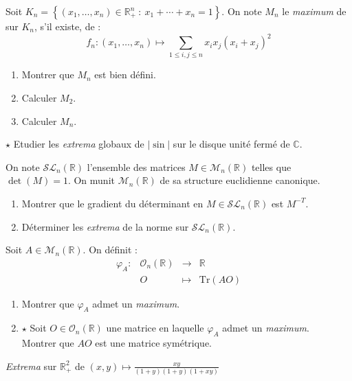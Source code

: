 \documentclass[french,a4paper]{article}
\newcommand{\R}{\mathbb{R}}
\newcommand{\C}{\mathbb{C}}
\newcommand{\Tr}{\text{Tr}}
\theoremstyle{plain}
\theoremstyle{definition}
\theoremstyle{remark}
\begin{document}
\begin{ex}[Moulin.CD.46]{}
	Soit $K_n=\left\{(x_1,\ldots,x_n)\in\R_+^n\ : \ x_1+\cdots+x_n=1\right\}$. On note $M_n$ le \textit{maximum} de sur $K_n$, s'il existe, de : $$f_n:(x_1,\ldots,x_n)\mapsto\sum_{1\leqslant i,j\leqslant n}x_ix_j(x_i+x_j)^2$$
	\begin{enumerate}
		\item Montrer que $M_n$ est bien défini.
		\item Calculer $M_2$. 
		\item Calculer $M_n$.
	\end{enumerate}
\end{ex}

\begin{ex}[Moulin.CD.47]{$\star$}
	Etudier les \textit{extrema} globaux de $\lvert \sin\rvert$ sur le disque unité fermé de $\C$.
\end{ex}

\begin{ex}[Moulin.CD.48]{}
	On note $\mathcal{SL}_n(\R)$ l'ensemble des matrices $M\in\mathcal{M}_n(\R)$ telles que $\det(M)=1$. On munit $\mathcal{M}_n(\R)$ de sa structure euclidienne canonique.
	\begin{enumerate}
		\item Montrer que le gradient du déterminant en $M\in\mathcal{SL}_n(\R)$ est $M^{-T}$.
		\item Déterminer les \textit{extrema} de la norme sur $\mathcal{SL}_n(\R)$.
	\end{enumerate}
\end{ex}

\begin{ex}[Moulin.CD.49]{}
	Soit $A\in\mathcal{M}_n(\R)$. On définit : $$\begin{array}{lrcl}
		\varphi_A:&\mathcal{O}_n(\R)&\longrightarrow&\R\\
		&O&\longmapsto&\Tr(AO)
	\end{array}$$
	\begin{enumerate}
		\item Montrer que $\varphi_A$ admet un \textit{maximum}.
		\item $\star$ Soit $O\in\mathcal{O}_n(\R)$ une matrice en laquelle $\varphi_A$ admet un \textit{maximum}. \\ Montrer que $AO$ est une matrice symétrique.
	\end{enumerate}
\end{ex}

\begin{ex}[Moulin.CD.50]{}
	\textit{Extrema} sur $\R_+^2$ de $(x,y)\mapsto\displaystyle\frac{xy}{(1+y)(1+y)(1+xy)}$
\end{ex}
\end{document}
